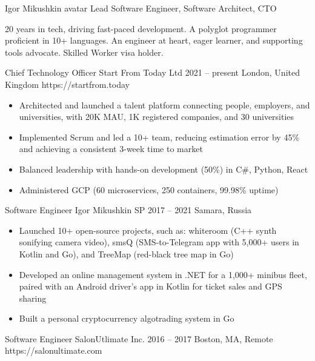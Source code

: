 \begin{paracol}{2}
\cvHeader%
    {Igor Mikushkin}
    {avatar}
    {Lead Software Engineer, Software Architect, CTO}

20 years in tech, driving fast-paced development.
A polyglot programmer proficient in 10+ languages.
An engineer at heart, eager learner, and supporting tools advocate.
Skilled Worker visa holder.

    \cvLeftEvent%
        {Chief Technology Officer}
        {Start From Today Ltd}
        {2021 -- present}
        {London, United Kingdom}
        {https://startfrom.today}

        \begin{itemize}
            \item Architected and launched a talent platform connecting people, employers, and universities,
                  with 20K MAU, 1K registered companies, and 30 universities
            \item Implemented Scrum and led a 10+ team,
                  reducing estimation error by 45\%
                  and achieving a consistent 3-week time to market
            \item Balanced leadership with hands-on development (50\%)
                  in C\#, Python, React
            \item Administered GCP (60 microservices, 250 containers, 99.98\% uptime)
        \end{itemize}

    \cvLeftEvent%
        {Software Engineer}
        {Igor Mikushkin SP}
        {2017 -- 2021}
        {Samara, Russia}
        {}

        \begin{itemize}
            \item Launched 10+ open-source projects, such as:
                  whiteroom (C++ synth sonifying camera video),
                  smsQ (SMS-to-Telegram app with 5,000+ users in Kotlin and Go),
                  and TreeMap (red-black tree map in Go)
            \item Developed an online management system in .NET for a 1,000+ minibus fleet,
                  paired with an Android driver’s app in Kotlin for ticket sales and GPS sharing
            \item Built a personal cryptocurrency algotrading system in Go
        \end{itemize}

    \cvLeftEvent%
        {Software Engineer}
        {SalonUtlimate Inc.}
        {2016 -- 2017}
        {Boston, MA, Remote}
        {https://salonultimate.com}


\end{paracol}
